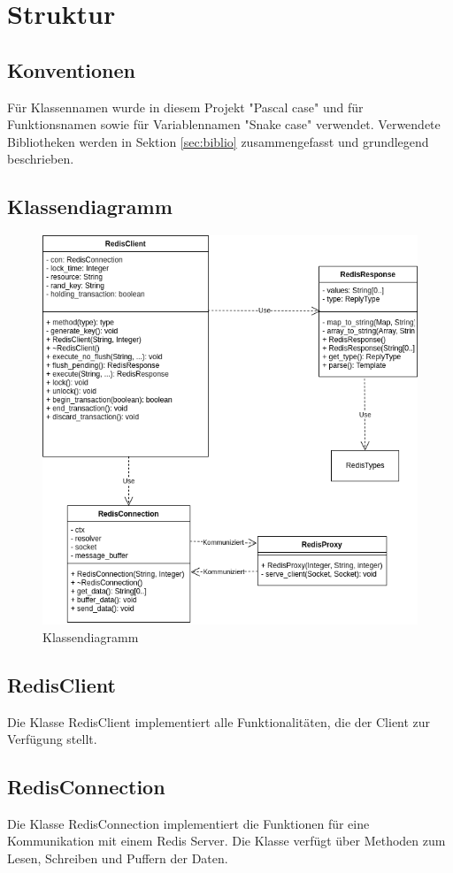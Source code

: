 \documentclass[12pt, letterpaper]{article}
\begin{document}
\section{Struktur}

\subsection{Konventionen}
Für Klassennamen wurde in diesem Projekt "Pascal case" und für Funktionsnamen sowie für Variablennamen "Snake case" verwendet. Verwendete Bibliotheken werden in Sektion \ref{sec:biblio} zusammengefasst und grundlegend beschrieben.

\subsection{Klassendiagramm}
\begin{figure}[H]
  \centering
  \includegraphics[width=.7\textwidth]{klassendiagram.png}
  \caption{Klassendiagramm}
  \label{fig:kdg}
\end{figure}

\subsection{RedisClient}
Die Klasse RedisClient implementiert alle Funktionalitäten, die der Client zur Verfügung stellt.

\subsection{RedisConnection}
Die Klasse RedisConnection implementiert die Funktionen für eine Kommunikation mit einem Redis Server. Die Klasse verfügt über Methoden zum Lesen, Schreiben und Puffern der Daten. 
\end{document}
